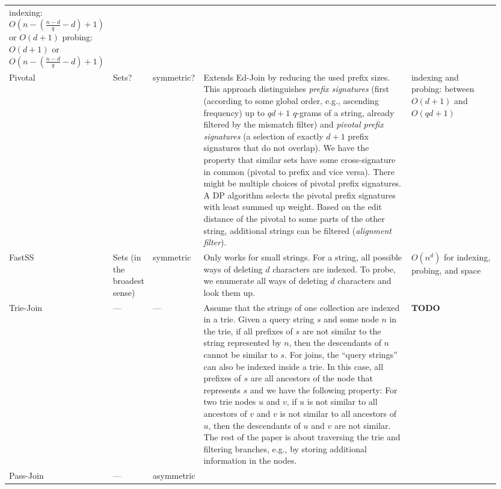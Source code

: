 \documentclass{article}
\begin{document}
\begin{footnotesize}
\begin{longtable}[c]{p{0.1\linewidth}p{0.05\linewidth}p{0.1\linewidth}p{0.5\linewidth}p{0.2\linewidth}}
        indexing: $O(n - (\frac{n-d}{q} - d) + 1)$ or $O(d + 1)$
        probing: $O(d + 1)$ or $O(n - (\frac{n-d}{q} - d) + 1)$
        \tabularnewline
        Pivotal~\cite{DBLP:conf/sigmod/DengLF14}&
        Sets?&
        symmetric?&
        Extends Ed-Join by reducing the used prefix sizes. This approach distinguishes \textit{prefix signatures} (first (according to some global order, e.g., ascending frequency) up to $qd+1$ $q$-grams of a string, already filtered by the mismatch filter) and \textit{pivotal prefix signatures} (a selection of exactly $d+1$ prefix signatures that do not overlap). We have the property that similar sets have some cross-signature in common (pivotal to prefix and vice versa). There might be multiple choices of pivotal prefix signatures. A DP algorithm selects the pivotal prefix signatures with least summed up weight. Based on the edit distance of the pivotal to some parts of the other string, additional strings can be filtered (\textit{alignment filter}).&
        indexing and probing: between $O(d + 1)$ and $O(qd + 1)$
        \tabularnewline
        FastSS~\cite{DBLP:conf/noms/BocekHHS08}&
        Sets (in the broadest sense)&
        symmetric&
        Only works for small strings. For a string, all possible ways of deleting $d$ characters are indexed. To probe, we enumerate all ways of deleting $d$ characters and look them up.&
        $O(n^d)$ for indexing, probing, and space
        \tabularnewline
        Trie-Join~\cite{DBLP:journals/pvldb/WangLF10}&
        ---&
        ---&
        Assume that the strings of one collection are indexed in a trie. Given a query string $s$ and some node $n$ in the trie, if all prefixes of $s$ are not similar to the string represented by $n$, then the descendants of $n$ cannot be similar to $s$. For joins, the \enquote{query strings} can also be indexed inside a trie. In this case, all prefixes of $s$ are all ancestors of the node that represents $s$ and we have the following property: For two trie nodes $u$ and $v$, if $u$ is not similar to all ancestors of $v$ and $v$ is not similar to all ancestors of $u$, then the descendants of $u$ and $v$ are not similar. The rest of the paper is about traversing the trie and filtering branches, e.g., by storing additional information in the nodes.&
        \textbf{TODO}
        \tabularnewline
        Pass-Join~\cite{DBLP:journals/pvldb/LiDWF11}&
        ---&
        asymmetric&

\end{longtable}
\end{footnotesize}
\end{document}
